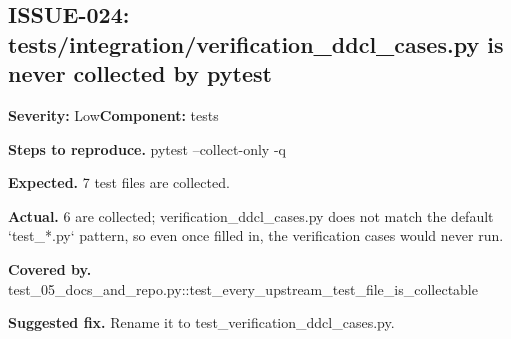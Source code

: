 \subsection*{ISSUE-024: tests/\allowbreak{}integration/\allowbreak{}verification\_\allowbreak{}ddcl\_\allowbreak{}cases.\allowbreak{}py is never collected by pytest}
\textbf{Severity:} Low\quad \textbf{Component:} tests\par
\textbf{Steps to reproduce.} pytest --collect-only -q\par
\textbf{Expected.} 7 test files are collected.\allowbreak{}\par
\textbf{Actual.} 6 are collected; verification\_\allowbreak{}ddcl\_\allowbreak{}cases.\allowbreak{}py does not match the default `test\_\allowbreak{}*.\allowbreak{}py` pattern, so even once filled in, the verification cases would never run.\allowbreak{}\par
\textbf{Covered by.} test\_\allowbreak{}05\_\allowbreak{}docs\_\allowbreak{}and\_\allowbreak{}repo.\allowbreak{}py::\allowbreak{}test\_\allowbreak{}every\_\allowbreak{}upstream\_\allowbreak{}test\_\allowbreak{}file\_\allowbreak{}is\_\allowbreak{}collectable\par
\textbf{Suggested fix.} Rename it to test\_\allowbreak{}verification\_\allowbreak{}ddcl\_\allowbreak{}cases.\allowbreak{}py.\allowbreak{}
